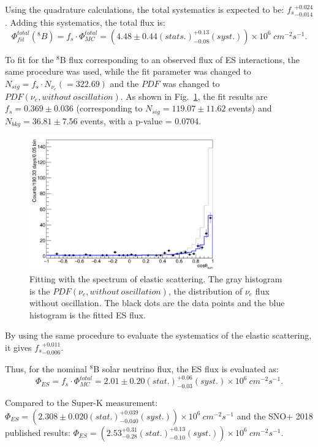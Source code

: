 Using the quadrature calculations, the total systematics is expected to be: ${f_s}^{+0.024}_{-0.014}$. Adding this systematics, the total flux is:
\begin{equation}
\Phi^{total}_{fit}(^8 B)=f_s\cdot \Phi^{total}_{MC}=(4.48\pm 0.44(stats.)^{+0.13}_{-0.08}(syst.))\times 10^6~cm^{-2}s^{-1}.
\end{equation}

To fit for the $^8$B flux corresponding to an observed flux of ES interactions, the same procedure was used, while the fit parameter was changed to $N_{sig}=f_s\cdot N_{\nu_e}(=322.69)$ and the $PDF$ was changed to $PDF(\nu_e,without~oscillation)$. As shown in Fig.~\ref{fig:ESfluxFit}, the fit results are $f_s=0.369\pm 0.036$ (corresponding to $N_{sig}=119.07\pm11.62$ events) and $N_{bkg}=36.81\pm 7.56$ events, with a p-value = 0.0704.

\begin{figure}[!htb]
	\centering
	\includegraphics[width=8cm]{ESfluxFit.png}
	\caption[Fitting with the spectrum of elastic scattering.]{Fitting with the spectrum of elastic scattering. The gray histogram is the $PDF(\nu_e,without~oscillation)$, the distribution of $\nu_e$ flux without oscillation. The black dots are the data points and the blue histogram is the fitted ES flux.}
	\label{fig:ESfluxFit}
\end{figure}

By using the same procedure to evaluate the systematics of the elastic scattering, it gives ${f_s}^{+0.011}_{-0.006}$.

Thus, for the nominal $^8$B solar neutrino flux, the ES flux is evaluated as:
\begin{equation}
\Phi_{ES}=f_s\cdot \Phi^{total}_{MC}=2.01\pm 0.20(stat.)^{+0.06}_{-0.03} (syst.)\times 10^6~cm^{-2}s^{-1}.
\end{equation}

Compared to the Super-K measurement: $\Phi_{ES}=(2.308\pm0.020(stat.)^{+0.039}_{-0.040}(syst.))\times 10^6~cm^{-2}s^{-1}$\cite{abe2016solar} and the SNO+ 2018 published results: $\Phi_{ES}=(2.53^{+0.31}_{-0.28}(stat.)^{+0.13}_{-0.10}(syst.))\times 10^6~cm^{-2}s^{-1}$\cite{anderson2019measurement}.

